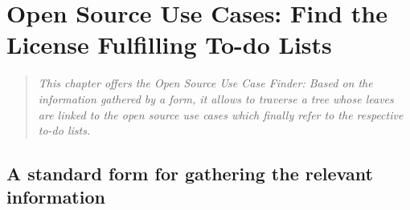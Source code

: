 %
%
%
%
%



\chapter{Open Source Use Cases: Find the License Fulfilling To-do Lists}\label{sec:OSUCfinder}

\footnotesize
\begin{quote}\itshape
This chapter offers the \emph{Open Source Use Case Finder}: Based on the
information gathered by a form, it allows to traverse a tree whose leaves are
linked to the \emph{open source use cases} which finally refer to the respective
to-do lists.
\end{quote}
\normalsize{}

\section{A standard form for gathering the relevant information}
\label{OSLiCStandardFormForGatheringInformation}
 
